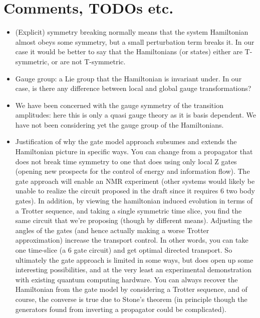 \documentclass[aps,pra,12pt,nofootinbib,superscriptaddress,longbibliography,showpacs]{revtex4-1}
\theoremstyle{plain}
\theoremstyle{definition}
\begin{document}
\section{Comments, TODOs etc.}

\begin{itemize}
\item
(Explicit) symmetry breaking normally means that the system Hamiltonian
almost obeys some symmetry, but a small perturbation term breaks
it. In our case it would be better to say that the Hamiltonians (or
states) either are T-symmetric, or are not T-symmetric.

\item
Gauge group: a Lie group that the Hamiltonian is invariant
under. In our case, is there any difference between local and global
gauge transformations?

\item We have been concerned with the gauge symmetry of the transition amplitudes: here this is only a quasi gauge theory as it is basis dependent.  We have not been considering yet the gauge group of the Hamiltonians.  

\item Justification of why the gate model approach subsumes and extends the Hamiltonian picture in specific ways. You can change from a propagator that does not break time symmetry to one that does using only local Z gates (opening new prospects for the control of energy and information flow).  The gate approach will enable an NMR experiment (other systems would likely be unable to realize the circuit proposed in the draft since it requires 6 two body gates).  In addition, by viewing the hamiltonian induced evolution in terms of a Trotter sequence, and taking a single symmetric time slice, you find the same circuit that we're proposing (though by different means).  Adjusting the angles of the gates (and hence actually making a worse Trotter approximation) increase the transport control.  In other words, you can take one time-slice (a 6 gate circuit) and get optimal directed transport.  So ultimately the gate approach is limited in some ways, but does open up some interesting possibilities, and at the very 
least an experimental demonstration with existing quantum computing hardware.  You can always recover the Hamiltonian from the gate model by considering a Trotter sequence, and of course, the converse is true due to Stone's theorem (in principle though the generators found from inverting a propagator could be complicated).  

\end{itemize}
\end{document}
